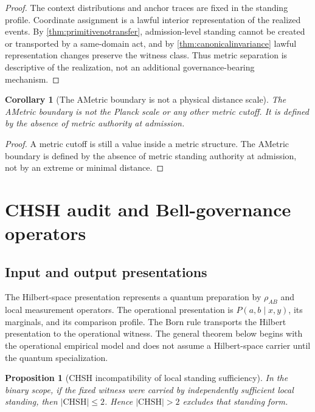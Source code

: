 \documentclass[11pt]{article}
\newtheorem{proposition}[theorem]{Proposition}
\newtheorem{corollary}[theorem]{Corollary}
\theoremstyle{definition}
\newcommand{\CHSH}{\mathrm{CHSH}}
\begin{document}
\begin{proof}
The context distributions and anchor traces are fixed in the standing profile. Coordinate assignment is a lawful interior representation of the realized events. By \cref{thm:primitivenotransfer}, admission-level standing cannot be created or transported by a same-domain act, and by \cref{thm:canonicalinvariance} lawful representation changes preserve the witness class. Thus metric separation is descriptive of the realization, not an additional governance-bearing mechanism.
\end{proof}

\begin{corollary}[The AMetric boundary is not a physical distance scale]
The AMetric boundary is not the Planck scale or any other metric cutoff. It is defined by the absence of metric authority at admission.
\end{corollary}

\begin{proof}
A metric cutoff is still a value inside a metric structure. The AMetric boundary is defined by the absence of metric standing authority at admission, not by an extreme or minimal distance.
\end{proof}

\section{CHSH audit and Bell-governance operators}\label{sec:chsh}

\subsection{Input and output presentations}
The Hilbert-space presentation represents a quantum preparation by $\rho_{AB}$ and local measurement operators. The operational presentation is $P(a,b\mid x,y)$, its marginals, and its comparison profile. The Born rule transports the Hilbert presentation to the operational witness. The general theorem below begins with the operational empirical model and does not assume a Hilbert-space carrier until the quantum specialization.

\begin{proposition}[CHSH incompatibility of local standing sufficiency]\label{prop:chshstanding}
In the binary scope, if the fixed witness were carried by independently sufficient local standing, then $|\CHSH|\le2$. Hence $|\CHSH|>2$ excludes that standing form.
\end{proposition}
\end{document}
